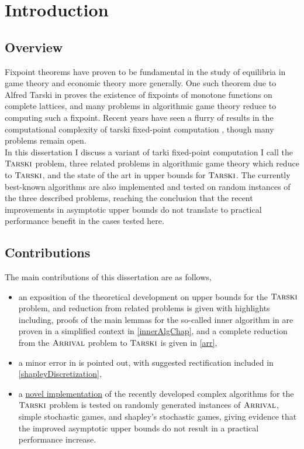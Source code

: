 \chapter{Introduction}
\section{Overview}
Fixpoint theorems have proven to be fundamental in the study of equilibria in
game theory and economic theory more generally. One such theorem due to Alfred Tarski in \citep{tarski}
proves the existence of fixpoints of monotone functions on complete lattices, and
many problems in algorithmic game theory reduce to computing such a fixpoint\citep{lowerBound}. Recent years have seen
a flurry of results in the computational complexity of tarski fixed-point computation \citep{dangQiYe, lowerBound, fasterTarski, chenLi},
though many problems remain open. \\
In this dissertation I discuss a variant of tarki fixed-point computation I call the $\textsc{Tarski}$ problem, three
related problems in algorithmic game theory which reduce to $\textsc{Tarski}$, and the state of the art in upper bounds for $\textsc{Tarski}$.
The currently best-known algorithms are also implemented and tested on random instances of the three described problems, reaching
the conclusion that the recent improvements in asymptotic upper bounds do not translate to practical performance benefit in the cases
tested here.
\section{Contributions}
The main contributions of this dissertation are as follows,
\begin{itemize}
  \item an exposition of the theoretical development on upper bounds for the $\textsc{Tarski}$ problem, and reduction from related problems is given with highlights including,
    proofs of the main lemmas for the so-called inner algorithm in \citep{fasterTarski} are proven in a simplified context in \cref{innerAlgChap}, and a 
    complete reduction from the $\textsc{Arrival}$ problem to $\textsc{Tarski}$ is given in \cref{arr},
  \item a minor error in \citep[Proposition 6.1.]{lowerBound} is pointed out, with suggested rectification included in \cref{shapleyDiscretization},
  \item a \href{https://www.github.com/angusjoshi/tarski}{novel implementation} of the recently developed complex algorithms for the $\textsc{Tarski}$ problem is tested
    on randomly generated instances of $\textsc{Arrival}$, simple stochastic games, and shapley's stochastic games, giving
    evidence that the improved asymptotic upper bounds do not result in a practical performance increase.
\end{itemize}
